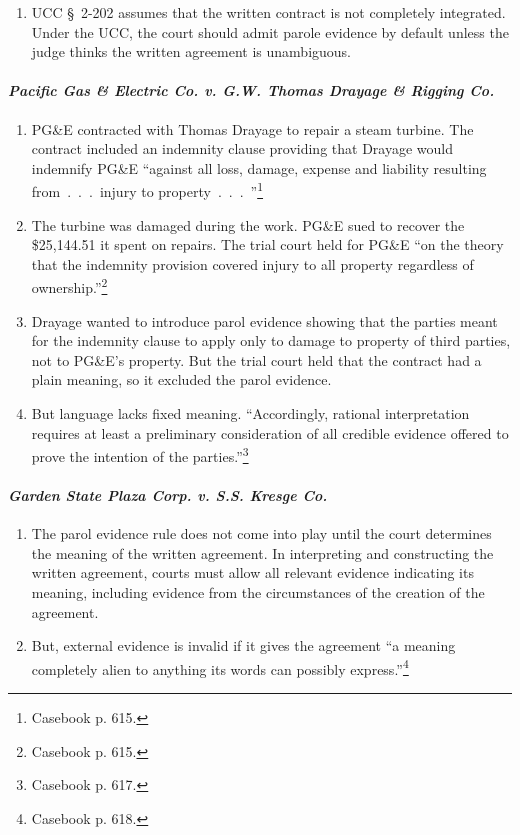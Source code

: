 \begin{enumerate}
    \item UCC \S\ 2-202 assumes that the written contract is not completely 
    integrated. Under the UCC, the court should admit parole evidence by 
    default unless the judge thinks the written agreement is unambiguous.
\end{enumerate}

\paragraph{\emph{Pacific Gas \& Electric Co. v. G.W. Thomas Drayage \& Rigging 
Co.}}

\begin{enumerate}
    \item PG\&E contracted with Thomas Drayage to repair a steam turbine. The 
    contract included an indemnity clause providing that Drayage would 
    indemnify PG\&E ``against all loss, damage, expense and liability 
    resulting from~.~.~.~injury to property~.~.~.~''\footnote{Casebook p. 
    615.}
    \item The turbine was damaged during the work. PG\&E sued to recover the 
    \$25,144.51 it spent on repairs. The trial court held for PG\&E ``on the 
    theory that the indemnity provision covered injury to all property 
    regardless of ownership.''\footnote{Casebook p. 615.}
    \item Drayage wanted to introduce parol evidence showing that the parties 
    meant for the indemnity clause to apply only to damage to property of 
    third parties, not to PG\&E's property. But the trial court held that the 
    contract had a plain meaning, so it excluded the parol evidence.
    \item But language lacks fixed meaning. ``Accordingly, rational 
    interpretation requires at least a preliminary consideration of all 
    credible evidence offered to prove the intention of the 
    parties.''\footnote{Casebook p. 617.}
\end{enumerate}

\paragraph{\emph{Garden State Plaza Corp. v. S.S. Kresge Co.}}

\begin{enumerate}
    \item The parol evidence rule does not come into play until the court 
    determines the meaning of the written agreement. In interpreting and 
    constructing the written agreement, courts must allow all relevant 
    evidence indicating its meaning, including evidence from the circumstances 
    of the creation of the agreement.
    \item But, external evidence is invalid if it gives the agreement ``a 
    meaning completely alien to anything its words can possibly 
    express.''\footnote{Casebook p. 618.}
\end{enumerate}

